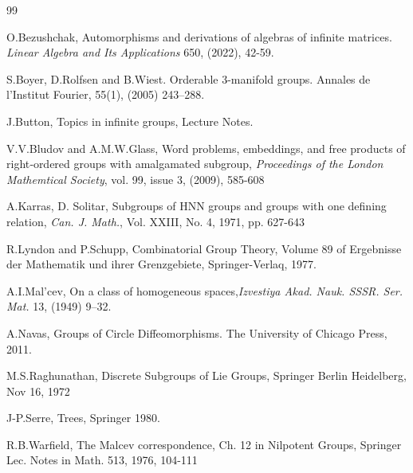 \documentclass[12pt]{amsart}
\theoremstyle{definition}
\begin{document}
 \begin{thebibliography}{99}

  O.Bezushchak, Automorphisms and derivations of algebras of infinite matrices. {\em Linear Algebra and Its Applications} 650, (2022), 42-59.

  S.Boyer, D.Rolfsen and B.Wiest. Orderable 3-manifold groups. Annales de l’Institut Fourier, 55(1), (2005) 243–288.
 
 J.Button, Topics in infinite groups, Lecture Notes.
 
  V.V.Bludov and A.M.W.Glass, Word problems, embeddings, and free products of right‐ordered groups with amalgamated subgroup, {\em Proceedings of the London Mathemtical Society}, vol. 99, issue 3, (2009), 585-608 

  A.Karras, D. Solitar, Subgroups of HNN groups and groups with one defining relation, {\em Can. J. Math.}, Vol. XXIII, No. 4, 1971, pp. 627-643 
   
  R.Lyndon and P.Schupp, Combinatorial Group Theory, Volume 89 of Ergebnisse der Mathematik und ihrer Grenzgebiete, Springer-Verlaq, 1977.
 
 A.I.Mal'cev,  On a class of homogeneous spaces,{\em  Izvestiya Akad. Nauk. SSSR. Ser. Mat.} 13, (1949) 9–32.
 
   A.Navas, Groups of Circle Diffeomorphisms.  The University of Chicago Press, 2011.

   M.S.Raghunathan,  Discrete Subgroups of Lie Groups, Springer Berlin Heidelberg, Nov 16, 1972 

   J-P.Serre, Trees, Springer 1980.
 
   R.B.Warfield, The Malcev correspondence, Ch. 12 in Nilpotent Groups, Springer Lec. Notes in Math. 513, 1976, 104-111
   
  \end{thebibliography}
   
 
 
 
    
 
 
\end{document}
